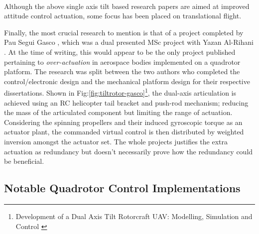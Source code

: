 \\
Although the above single axis tilt based research papers are aimed at improved attitude control actuation, some focus has been placed on translational flight. 
\par
Finally, the most crucial research to mention is that of a project completed by Pau Segui Gasco \cite{tiltgasco}, which was a dual presented MSc project with Yazan Al-Rihani \cite{tiltrihani}. At the time of writing, this would appear to be the only project published pertaining to \emph{over-actuation} in aerospace bodies implemented on a quadrotor platform. The research was split between the two authors who completed the control/electronic design and the mechanical platform design for their respective dissertations. Shown in Fig:\ref{fig:tiltrotor-gasco}\footnote{Development of a Dual Axis Tilt Rotorcraft UAV: Modelling, Simulation and Control \cite{tiltgasco}}, the dual-axis articulation is achieved using an RC helicopter tail bracket and push-rod mechanism; reducing the mass of the articulated component but limiting the range of actuation. Considering the spinning propellers and their induced gyroscopic torque as an actuator plant, the commanded virtual control is then distributed by weighted inversion amongst the actuator set. The whole projects justifies the extra actuation as redundancy but doesn't necessarily prove how the redundancy could be beneficial.
\subsection{Notable Quadrotor Control Implementations}
\label{subsec:intro.lit.control}
